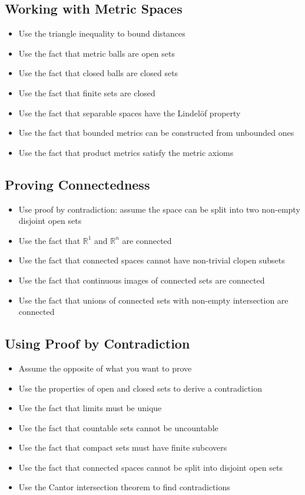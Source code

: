 \subsection*{Working with Metric Spaces}
\begin{itemize}
\item Use the triangle inequality to bound distances
\item Use the fact that metric balls are open sets
\item Use the fact that closed balls are closed sets
\item Use the fact that finite sets are closed
\item Use the fact that separable spaces have the Lindelöf property
\item Use the fact that bounded metrics can be constructed from unbounded ones
\item Use the fact that product metrics satisfy the metric axioms
\end{itemize}

\subsection*{Proving Connectedness}
\begin{itemize}
\item Use proof by contradiction: assume the space can be split into two non-empty disjoint open sets
\item Use the fact that $\mathbb{R}^1$ and $\mathbb{R}^n$ are connected
\item Use the fact that connected spaces cannot have non-trivial clopen subsets
\item Use the fact that continuous images of connected sets are connected
\item Use the fact that unions of connected sets with non-empty intersection are connected
\end{itemize}

\subsection*{Using Proof by Contradiction}
\begin{itemize}
\item Assume the opposite of what you want to prove
\item Use the properties of open and closed sets to derive a contradiction
\item Use the fact that limits must be unique
\item Use the fact that countable sets cannot be uncountable
\item Use the fact that compact sets must have finite subcovers
\item Use the fact that connected spaces cannot be split into disjoint open sets
\item Use the Cantor intersection theorem to find contradictions
\end{itemize}

